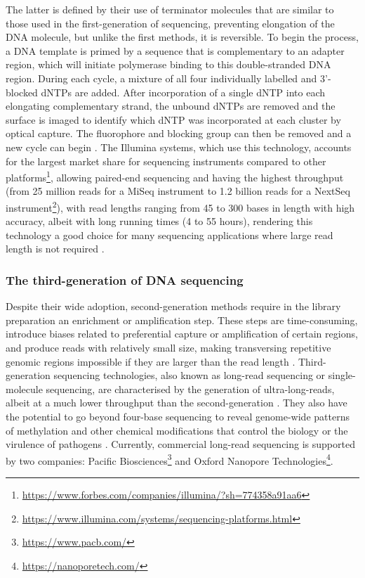 The latter is defined by their use of terminator molecules that are similar to those used in the first-generation of sequencing, preventing elongation of the \ac{DNA} molecule, but unlike the first methods, it is reversible. 
To begin the process, a \ac{DNA} template is primed by a sequence that is complementary to an adapter region, which will initiate polymerase binding to this double-stranded \ac{DNA} region. 
During each cycle, a mixture of all four individually labelled and 3'-blocked \ac{dNTP}s are added. 
After incorporation of a single \ac{dNTP} into each elongating complementary strand, the unbound \ac{dNTP}s are removed and the surface is imaged to identify which \ac{dNTP} was incorporated at each cluster by optical capture. 
The fluorophore and blocking group can then be removed and a new cycle can begin \citep{goodwin_coming_2016}. 
The Illumina systems, which use this technology, accounts for the largest market share for sequencing instruments compared to other platforms\footnote{\url{https://www.forbes.com/companies/illumina/?sh=774358a91aa6}}, allowing paired-end sequencing and having the highest throughput (from 25 million reads for a MiSeq instrument to  1.2 billion reads for a NextSeq instrument\footnote{\url{https://www.illumina.com/systems/sequencing-platforms.html}}), with read lengths ranging from 45 to 300 bases in length with high accuracy, albeit with long running times (4 to 55 hours), rendering this technology a good choice for many sequencing applications where large read length is not required \citep{loman_performance_2012, gupta_chapter_2014, hagemann_overview_2015}.

\subsubsection{The third-generation of \ac{DNA} sequencing} \label{ssec:_intro_3rd_gen_seq}

Despite their wide adoption, second-generation methods require in the library preparation an enrichment or amplification step. 
These steps are time-consuming, introduce biases related to preferential capture or amplification of certain regions, and produce reads with relatively small size, making transversing repetitive genomic regions impossible if they are larger than the read length \citep{hagemann_overview_2015}. 
Third-generation sequencing technologies, also known as long-read sequencing or single-molecule sequencing, are characterised by the generation of ultra-long-reads, albeit at a much lower throughput than the second-generation \citep{hoang_long-reads-based_2022}. 
They also have the potential to go beyond four-base sequencing to reveal genome-wide patterns of methylation and other chemical modifications that control the biology or the virulence of pathogens \citep{korlach_going_2012}. 
Currently, commercial long-read sequencing is supported by two companies: Pacific Biosciences\footnote{\url{https://www.pacb.com/}} and Oxford Nanopore Technologies\footnote{\url{https://nanoporetech.com/}}. 

